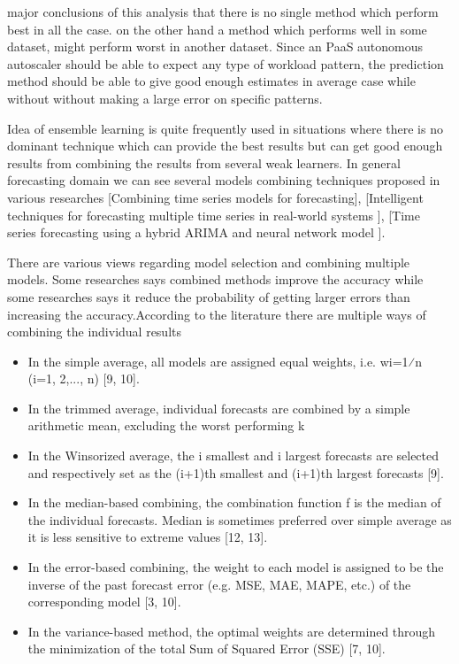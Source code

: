 major conclusions of this analysis that there is no single method which perform best in all the case. on the other hand a method which performs well in some dataset, might perform worst in another dataset.
Since an PaaS autonomous autoscaler should be able to expect any type of workload pattern, the prediction method should be able to give good enough estimates in average case while without without making a large error on specific patterns.

Idea of ensemble learning is quite frequently used in situations where there is no dominant technique which can provide the best results but can get good enough results from combining the results from several weak learners. In general forecasting domain we can see several models combining techniques  proposed in various researches [Combining time series models for forecasting], [Intelligent techniques for forecasting multiple time series in real-world systems ],
[Time series forecasting using a hybrid ARIMA and neural network model ].  

There are various views regarding model selection and combining multiple models. Some researches says combined methods improve the accuracy while some researches says it reduce the probability of getting larger errors than increasing the accuracy.According to the literature there are multiple ways of combining the individual results 
\begin{itemize}
\item In the simple average, all models are assigned equal weights, i.e. wi=1⁄n (i=1, 2,..., n) [9, 10].
\end{itemize}
\begin{itemize}
\item In the trimmed average, individual forecasts are combined by a simple arithmetic mean, excluding the worst performing k%
\end{itemize}
\begin{itemize}
\item In the Winsorized average, the i smallest and i largest forecasts are selected and respectively set as the (i+1)th smallest and (i+1)th largest forecasts [9].
\end{itemize}
\begin{itemize}
\item In the median-based combining, the combination function f is the median of the individual forecasts. Median is sometimes preferred over simple average as it is less sensitive to extreme values [12, 13].
\end{itemize}
\begin{itemize}
\item In the error-based combining, the weight to each model is assigned to be the inverse of the past forecast error (e.g. MSE, MAE, MAPE, etc.) of the corresponding model [3, 10].
\end{itemize}
\begin{itemize}
\item In the variance-based method, the optimal weights are determined through the minimization of the total Sum of Squared Error (SSE) [7, 10].
\end{itemize}
